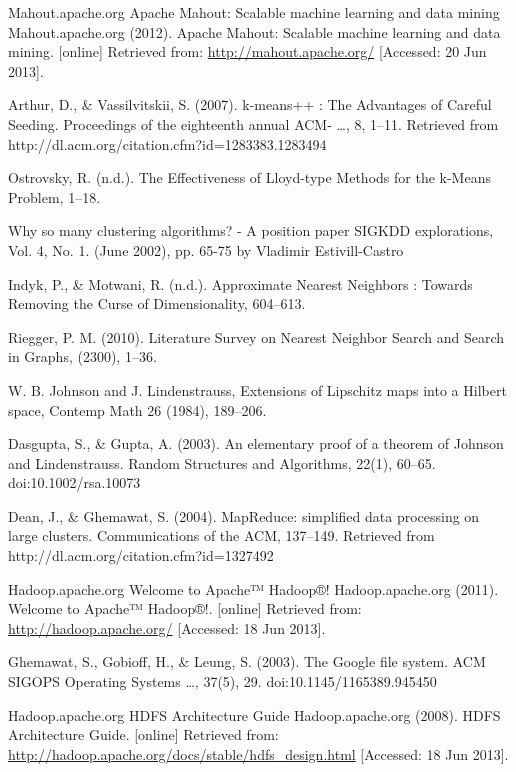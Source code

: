 \documentclass{article}
\begin{document}
\begin{thebibliography}{99}
     Mahout.apache.org
        Apache Mahout: Scalable machine learning and data mining
        Mahout.apache.org (2012). Apache Mahout: Scalable machine learning and
        data mining. [online] Retrieved from: \url{http://mahout.apache.org/}
        [Accessed: 20 Jun 2013].

     Arthur, D., \& Vassilvitskii, S. (2007). k-means++ : The Advantages of
        Careful Seeding. Proceedings of the eighteenth annual ACM- …, 8, 1–11.
        Retrieved from http://dl.acm.org/citation.cfm?id=1283383.1283494

     Ostrovsky, R. (n.d.). The Effectiveness of Lloyd-type
        Methods for the k-Means Problem, 1–18.

     Why so many clustering algorithms? - A position paper SIGKDD
        explorations, Vol. 4, No. 1. (June 2002), pp. 65-75 by Vladimir
        Estivill-Castro

     Indyk, P., \& Motwani, R. (n.d.). Approximate Nearest Neighbors :
        Towards Removing the Curse of Dimensionality, 604–613.

     Riegger, P. M. (2010). Literature Survey on Nearest Neighbor Search and Search in Graphs, (2300), 1–36.

     W. B. Johnson and J. Lindenstrauss, Extensions of Lipschitz maps into a Hilbert space, Contemp Math 26 (1984), 189–206.

     Dasgupta, S., \& Gupta, A. (2003). An elementary proof of a theorem of Johnson and Lindenstrauss. Random Structures and Algorithms, 22(1), 60–65. doi:10.1002/rsa.10073

     Dean, J., \& Ghemawat, S. (2004). MapReduce: simplified data
        processing on large clusters. Communications of the ACM, 137–149.
        Retrieved from http://dl.acm.org/citation.cfm?id=1327492

     Hadoop.apache.org
        Welcome to Apache™ Hadoop®!
        Hadoop.apache.org (2011). Welcome to Apache™ Hadoop®!. [online]
        Retrieved from: \url{http://hadoop.apache.org/} [Accessed: 18 Jun 2013].

     Ghemawat, S., Gobioff, H., \& Leung, S. (2003). The Google
        file system. ACM SIGOPS Operating Systems …, 37(5), 29.
        doi:10.1145/1165389.945450

     Hadoop.apache.org
        HDFS Architecture Guide
        Hadoop.apache.org (2008). HDFS Architecture Guide. [online] Retrieved
        from: \url{http://hadoop.apache.org/docs/stable/hdfs_design.html} [Accessed:
        18 Jun 2013].


\end{thebibliography}
\end{document}
